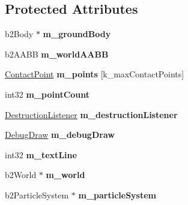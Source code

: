 \subsection*{Protected Attributes}
\begin{DoxyCompactItemize}
\item 
\hypertarget{classTest_af0a331a4ee6914e6abe263759c3b3705}{b2\-Body $\ast$ {\bfseries m\-\_\-ground\-Body}}\label{classTest_af0a331a4ee6914e6abe263759c3b3705}

\item 
\hypertarget{classTest_ac1c97085c255562129e6e083f1669617}{b2\-A\-A\-B\-B {\bfseries m\-\_\-world\-A\-A\-B\-B}}\label{classTest_ac1c97085c255562129e6e083f1669617}

\item 
\hypertarget{classTest_a3e8d8a7956cbb8c379e4bb917eb44f67}{\hyperlink{structContactPoint}{Contact\-Point} {\bfseries m\-\_\-points} \mbox{[}k\-\_\-max\-Contact\-Points\mbox{]}}\label{classTest_a3e8d8a7956cbb8c379e4bb917eb44f67}

\item 
\hypertarget{classTest_a1c42f2908bb7ec1a04b2d2c35c974b05}{int32 {\bfseries m\-\_\-point\-Count}}\label{classTest_a1c42f2908bb7ec1a04b2d2c35c974b05}

\item 
\hypertarget{classTest_a1d407eb8533e2c310995e60c9abdb37c}{\hyperlink{classDestructionListener}{Destruction\-Listener} {\bfseries m\-\_\-destruction\-Listener}}\label{classTest_a1d407eb8533e2c310995e60c9abdb37c}

\item 
\hypertarget{classTest_a639536a3e73f7cfa8a311559eef4d6a7}{\hyperlink{classDebugDraw}{Debug\-Draw} {\bfseries m\-\_\-debug\-Draw}}\label{classTest_a639536a3e73f7cfa8a311559eef4d6a7}

\item 
\hypertarget{classTest_a4f796421176f321ee8e82f82206c8445}{int32 {\bfseries m\-\_\-text\-Line}}\label{classTest_a4f796421176f321ee8e82f82206c8445}

\item 
\hypertarget{classTest_abadd9abd618accf5f759c4d3759c50c3}{b2\-World $\ast$ {\bfseries m\-\_\-world}}\label{classTest_abadd9abd618accf5f759c4d3759c50c3}

\item 
\hypertarget{classTest_a8217aa4a96a0856bb7f69e75ff5004ae}{b2\-Particle\-System $\ast$ {\bfseries m\-\_\-particle\-System}}\label{classTest_a8217aa4a96a0856bb7f69e75ff5004ae}


\end{DoxyCompactItemize}
